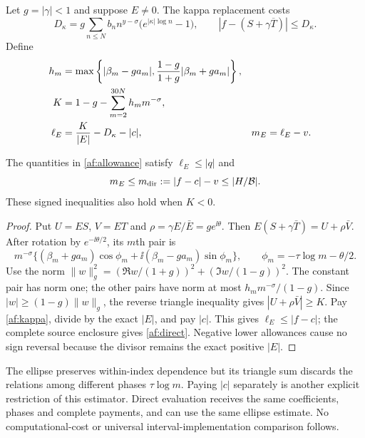 Let $g=|\gamma|<1$ and suppose $E\ne0$. The kappa replacement costs
\begin{equation}
 D_\kappa=g\sum_{n\le N}b_n n^{y-\sigma}
                    \bigl(e^{|\kappa|\log n}-1\bigr),
 \qquad |f-(S+\gamma\overline T)|\le D_\kappa.
 \label{af:kappa}
\end{equation}
Define
\begin{align}
 h_m&=\max\left\{|\beta_m-ga_m|,
          \frac{1-g}{1+g}|\beta_m+ga_m|\right\},\notag\\
 K&=1-g-\sum_{m=2}^{30N}h_m m^{-\sigma},\notag\\
 \ell_E&=\frac{K}{|E|}-D_\kappa-|c|,
 &m_E&=\ell_E-v.
 \label{af:allowance}
\end{align}

\begin{lemma}
The quantities in \eqref{af:allowance} satisfy
$\ell_E\le|q|$ and
\begin{equation}
 m_E\le m_{\rm dir}:=|f-c|-v\le|H/\mathcal B|.
 \label{af:direct}
\end{equation}
These signed inequalities also hold when $K<0$.
\end{lemma}

\begin{proof}
Put $U=ES$, $V=ET$ and $\rho=\gamma E/\bar E=g e^{\ii\theta}$.
Then $E(S+\gamma\bar T)=U+\rho\bar V$.
After rotation by $e^{-\ii\theta/2}$, its $m$th pair is
\[
 m^{-\sigma}\bigl\{(\beta_m+ga_m)\cos\phi_m
                 +\ii(\beta_m-ga_m)\sin\phi_m\bigr\},
 \qquad \phi_m=-\tau\log m-\theta/2.
\]
Use the norm
$\|w\|_g^2=(\Re w/(1+g))^2+(\Im w/(1-g))^2$.
The constant pair has norm one; the other pairs have norm at most
$h_m m^{-\sigma}/(1-g)$. Since $|w|\ge(1-g)\|w\|_g$,
the reverse triangle inequality gives $|U+\rho\bar V|\ge K$.
Pay \eqref{af:kappa}, divide by the exact $|E|$, and pay $|c|$.
This gives $\ell_E\le|f-c|$; the complete source enclosure gives
\eqref{af:direct}. Negative lower allowances cause no sign reversal
because the divisor remains the exact positive $|E|$.
\end{proof}

The ellipse preserves within-index dependence but its triangle sum
discards the relations among different phases $\tau\log m$. Paying
$|c|$ separately is another explicit restriction of this estimator.
Direct evaluation receives the same coefficients, phases and complete
payments, and can use the same ellipse estimate. No computational-cost
or universal interval-implementation comparison follows.

